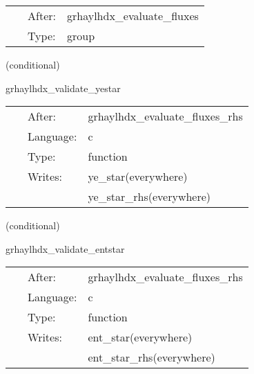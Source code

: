 \documentclass{article}
\begin{document}
\hspace{5mm}

 \begin{tabular*}{160mm}{cll} 
~ & After:  & grhaylhdx\_evaluate\_fluxes \\ 
~ & Type:  & group \\ 
\end{tabular*} 


\vspace{5mm}

   (conditional) 

\hspace{5mm} grhaylhdx\_validate\_yestar 

\hspace{5mm}{\it  } 


\hspace{5mm}

 \begin{tabular*}{160mm}{cll} 
~ & After:  & grhaylhdx\_evaluate\_fluxes\_rhs \\ 
~ & Language:  & c \\ 
~ & Type:  & function \\ 
~ & Writes:  & ye\_star(everywhere) \\ 
~& ~ &ye\_star\_rhs(everywhere)\\ 
\end{tabular*} 


\vspace{5mm}

   (conditional) 

\hspace{5mm} grhaylhdx\_validate\_entstar 

\hspace{5mm}{\it  } 


\hspace{5mm}

 \begin{tabular*}{160mm}{cll} 
~ & After:  & grhaylhdx\_evaluate\_fluxes\_rhs \\ 
~ & Language:  & c \\ 
~ & Type:  & function \\ 
~ & Writes:  & ent\_star(everywhere) \\ 
~& ~ &ent\_star\_rhs(everywhere)\\ 
\end{tabular*} 


\vspace{5mm}
\end{document}
